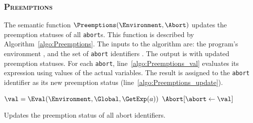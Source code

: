 \subsubsection{\textsc{Preemptions}}
\label{sec:forec_Preemptions}
The semantic function $\Preemptions(\Environment, \Abort)$
updates the preemption statuses of all \verb$abort$s. This function
is described by Algorithm~\ref{algo:Preemptions}. The inputs 
to the algorithm are: the program's environment \Environment{}, 
and the set of \verb$abort$ identifiers \Abort{}. The output is 
\Abort{} with updated preemption statuses. For each \verb$abort$, 
line~\ref{algo:Preemptions_val} evaluates its expression 
using values of the actual variables. The result 
is assigned to the \verb$abort$ identifier as its new preemption 
status (line~\ref{algo:Preemptions_update}).

\begin{algorithm}[t]
	\begin{algorithmic}[1]
		\Function{$\Preemptions$}{\Environment{}, \Abort{}}
			\ForAll {$\abort \in \Abort$}
				\State $\val = \Eval(\Environment, \Global, \GetExp(a))$	\label{algo:Preemptions_val}
				\State $\Abort[\abort \gets \val]$							\label{algo:Preemptions_update}
			\EndFor
			\State \Return \Abort
		\EndFunction
	\end{algorithmic}
	
	\caption{Updates the preemption status of all abort identifiers.}
	\label{algo:Preemptions}
\end{algorithm}

